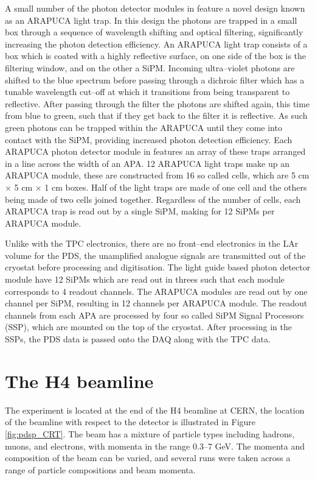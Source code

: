 A small number of the photon detector modules in \protodune{} feature a novel 
design known as an ARAPUCA light trap. In this design the photons are trapped 
in a small box through a sequence of wavelength shifting and optical 
filtering, significantly increasing the photon detection 
efficiency\cite{Segreto:2018jdx}. An ARAPUCA light trap consists of a box 
which is coated with a highly reflective surface, on one side of the box is 
the filtering window, and on the other a SiPM. Incoming ultra--violet photons 
are shifted to the blue spectrum before passing through a dichroic filter 
which has a tunable wavelength cut--off at which it transitions from being 
transparent to reflective. After passing through the filter the photons are 
shifted again, this time from blue to green, such that if they get back to the 
filter it is reflective. As such green photons can be trapped within the 
ARAPUCA until they come into contact with the SiPM, providing increased photon 
detection efficiency. Each ARAPUCA photon detector module in \protodune{} 
features an array of these traps arranged in a line across the width of an 
APA. 12 ARAPUCA light traps make up an ARAPUCA module, these are constructed 
from 16 so called cells, which are 5 cm $\times$ 5 cm $\times$ 1 cm boxes.  
Half of the light traps are made of one cell and the others being made of two 
cells joined together. Regardless of the number of cells, each ARAPUCA trap is 
read out by a single SiPM, making for 12 SiPMs per ARAPUCA module.

Unlike with the TPC electronics, there are no front--end electronics in the LAr
volume for the PDS, the unamplified analogue signals are transmitted out of the
cryostat before processing and digitisation. The light guide based photon 
detector module have 12 SiPMs which are read out in threes such that each 
module corresponds to 4 readout channels. The ARAPUCA modules are read out by
one channel per SiPM, resulting in 12 channels per ARAPUCA module. The readout 
channels from each APA are processed by four so called SiPM Signal Processors 
(SSP), which are mounted on the top of the cryostat. After processing in the 
SSPs, the PDS data is passed onto the DAQ along with the TPC data.

\section{The H4 beamline} \label{sec:h4}

The \protodune{} experiment is located at the end of the H4 beamline at CERN,
the location of the beamline with respect to the detector is illustrated in
Figure \ref{fig:pdsp_CRT}. The beam has a mixture of particle types including
hadrons, muons, and electrons, with momenta in the range 0.3--7 GeV. The momenta
and composition of the beam can be varied, and several runs were taken across a
range of particle compositions and beam momenta.

